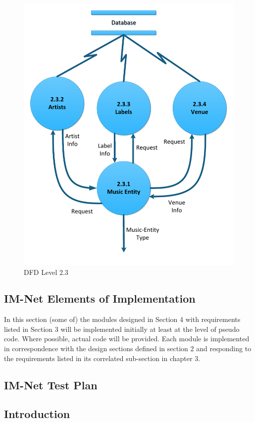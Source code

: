 \documentclass[letterpaper,12pt]{article}
\newcommand{\Section}[1]{\section{#1} \setcounter{figure}{0}}
\begin{document}
{\eject

\begin{figure}[h]
\centering
\includegraphics[scale=0.6]{DFD_level_2_3.pdf}
\caption{DFD Level 2.3}
\label{fig:DFD_level_2.3}
\end{figure}

\eject

 
\textcolor{section}{\Section{IM-Net Elements of Implementation}}

In this section (some of) the modules designed in Section 4 with requirements listed in Section 3 will be implemented initially at least at the level of pseudo code. Where possible, actual code will be provided. Each module is implemented in correspondence with the design sections defined in section 2 and responding to the requirements listed in its correlated sub-section in chapter 3.

\eject 

\textcolor{section}{\Section{IM-Net Test Plan}}

\textcolor{subsection}{\subsection{Introduction}}

}
\end{document}
